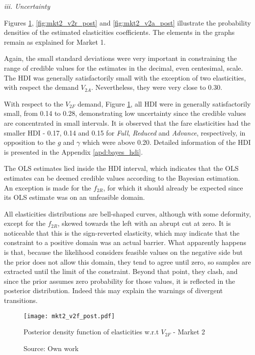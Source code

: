 \textit{iii. Uncertainty}

Figures \ref{fig:mkt2_v2f_post}, \ref{fig:mkt2_v2r_post} and \ref{fig:mkt2_v2a_post} illustrate the probability densities of the estimated elasticities coefficients. The elements in the graphs remain as explained for Market 1.

Again, the small standard deviations were very important in constraining the range of credible values for the estimates in the decimal, even centesimal, scale. The HDI was generally satisfactorily small with the exception of two elasticities, with respect the demand $V_{2A}$. Nevertheless, they were very close to 0.30.

With respect to the $V_{2F}$ demand, Figure \ref{fig:mkt2_v2f_post}, all HDI were in generally satisfactorily small, from 0.14 to 0.28, demonstrating low uncertainty since the credible values are concentrated in small intervals. It is observed that the fare elasticities had the smaller HDI - 0.17, 0.14 and 0.15 for \textit{Full}, \textit{Reduced} and \textit{Advance}, respectively, in opposition to the $g$ and $\gamma$ which were above 0.20. Detailed information of the HDI is presented in the Appendix \ref{apd:bayes_hdi}. 

The OLS estimates lied inside the HDI interval, which indicates that the OLS estimates can be deemed credible values according to the Bayesian estimation. An exception is made for the $f_{2R}$, for which it should already be expected since its OLS estimate was on an unfeasible domain. 

All elasticities distributions are bell-shaped curves, although with some deformity, except for the $f_{2R}$, skewed towards the left with an abrupt cut at zero. It is noticeable that this is the sign-reverted elasticity, which may indicate that the constraint to a positive domain was an actual barrier. What apparently happens is that, because the likelihood considers feasible values on the negative side but the prior does not allow this domain, they tend to agree until zero, so samples are extracted until the limit of the constraint. Beyond that point, they clash, and since the prior assumes zero probability for those values, it is reflected in the posterior distribution. Indeed this may explain the warnings of divergent transitions. 

\begin{figure}[H]
\centering
\texttt{[image: mkt2\_v2f\_post.pdf]}
\caption{Posterior density function of elasticities w.r.t $V_{2F}$ - Market 2}
\label{fig:mkt2_v2f_post}
\caption*{Source: Own work}
\end{figure} 

